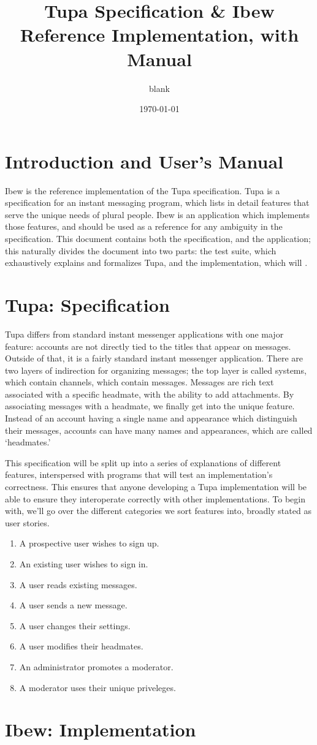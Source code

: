 \documentclass{book}
\title{Tupa Specification \& Ibew Reference Implementation, with Manual}
\author{blank}
\date{\today}
\begin{document}
\maketitle
\tableofcontents

\part{Introduction and User's Manual}
Ibew is the reference implementation of the Tupa specification.
Tupa is a specification for an instant messaging program, which lists in detail features that serve the unique needs of plural people.
Ibew is an application which implements those features, and should be used as a reference for any ambiguity in the specification.
This document contains both the specification, and the application; this naturally divides the document into two parts: the test suite, which exhaustively explains and formalizes Tupa, and the implementation, which will .


\part{Tupa: Specification}

Tupa differs from standard instant messenger applications with one major feature: accounts are not directly tied to the titles that appear on messages.
Outside of that, it is a fairly standard instant messenger application.
There are two layers of indirection for organizing messages; the top layer is called systems, which contain channels, which contain messages.
Messages are rich text associated with a specific headmate, with the ability to add attachments.
By associating messages with a headmate, we finally get into the unique feature.
Instead of an account having a single name and appearance which distinguish their messages, accounts can have many names and appearances, which are called `headmates.'

This specification will be split up into a series of explanations of different features, interspersed with programs that will test an implementation's correctness.
This ensures that anyone developing a Tupa implementation will be able to ensure they interoperate correctly with other implementations.
To begin with, we'll go over the different categories we sort features into, broadly stated as user stories.

\begin{enumerate}
\item A prospective user wishes to sign up.
\item An existing user wishes to sign in.
\item A user reads existing messages.
\item A user sends a new message.
\item A user changes their settings.
\item A user modifies their headmates.
\item An administrator promotes a moderator.
\item A moderator uses their unique priveleges.
\end{enumerate}



\part{Ibew: Implementation}





\end{document}
